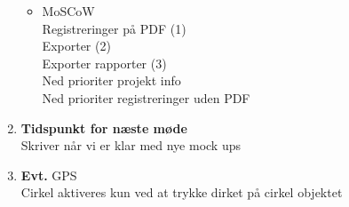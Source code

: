 \begin{enumerate}
\begin{itemize}[-]
			\item MoSCoW \\
				Registreringer på PDF (1) \\
				Exporter (2) \\
				Exporter rapporter (3) \\
				Ned prioriter projekt info \\
				Ned prioriter registreringer uden PDF \\
				
		\end{itemize}	
		\item \textbf{Tidspunkt for næste møde}\\
		Skriver når vi er klar med nye mock ups \\
		\item \textbf{Evt.}
			GPS \\
			Cirkel aktiveres kun ved at trykke dirket på cirkel objektet \\
	\end{enumerate}
